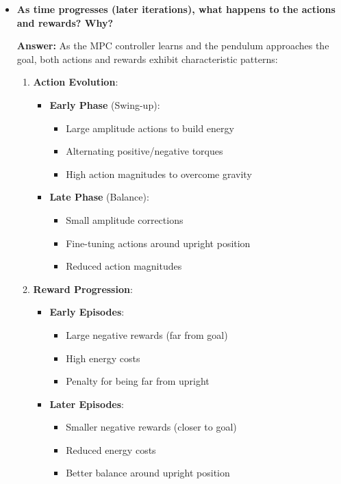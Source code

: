\begin{itemize}
    \item \textbf{As time progresses (later iterations), what happens to the actions and rewards? Why?}
    
    \textbf{Answer:} As the MPC controller learns and the pendulum approaches the goal, both actions and rewards exhibit characteristic patterns:
    
    \begin{enumerate}
        \item \textbf{Action Evolution}:
        \begin{itemize}
            \item \textbf{Early Phase} (Swing-up):
            \begin{itemize}
                \item Large amplitude actions to build energy
                \item Alternating positive/negative torques
                \item High action magnitudes to overcome gravity
            \end{itemize}
            
            \item \textbf{Late Phase} (Balance):
            \begin{itemize}
                \item Small amplitude corrections
                \item Fine-tuning actions around upright position
                \item Reduced action magnitudes
            \end{itemize}
        \end{itemize}
        
        \item \textbf{Reward Progression}:
        \begin{itemize}
            \item \textbf{Early Episodes}:
            \begin{itemize}
                \item Large negative rewards (far from goal)
                \item High energy costs
                \item Penalty for being far from upright
            \end{itemize}
            
            \item \textbf{Later Episodes}:
            \begin{itemize}
                \item Smaller negative rewards (closer to goal)
                \item Reduced energy costs
                \item Better balance around upright position
            \end{itemize}
        \end{itemize}
        

\end{enumerate}
\end{itemize}
